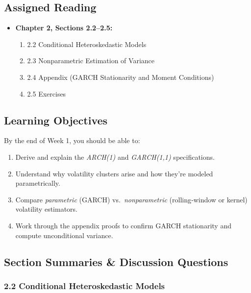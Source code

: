 \documentclass[11pt]{amsart}
\begin{document}
\subsection{Assigned Reading}
\begin{itemize}[noitemsep,left=0pt]
	\item \textbf{Chapter 2, Sections 2.2–2.5:}
	      \begin{enumerate}[noitemsep,left=1em]
		      \item 2.2 Conditional Heteroskedastic Models
		      \item 2.3 Nonparametric Estimation of Variance
		      \item 2.4 Appendix (GARCH Stationarity and Moment Conditions)
		      \item 2.5 Exercises
	      \end{enumerate}
\end{itemize}

\subsection{Learning Objectives}
By the end of Week 1, you should be able to:
\begin{enumerate}[noitemsep,left=0pt]
	\item Derive and explain the \emph{ARCH(1)} and \emph{GARCH(1,1)} specifications.
	\item Understand why volatility clusters arise and how they're modeled parametrically.
	\item Compare \emph{parametric} (GARCH) vs.\ \emph{nonparametric} (rolling‐window or kernel) volatility estimators.
	\item Work through the appendix proofs to confirm GARCH stationarity and compute unconditional variance.
\end{enumerate}

\subsection{Section Summaries \& Discussion Questions}

\subsubsection{2.2 Conditional Heteroskedastic Models}
\end{document}
